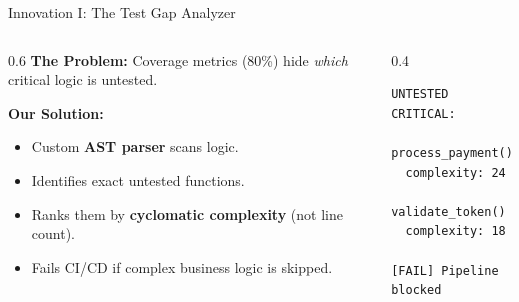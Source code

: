 \documentclass[aspectratio=169, 10pt]{beamer}
\begin{document}
\begin{frame}[fragile]{Innovation I: The Test Gap Analyzer}
  \begin{columns}[T]
    \begin{column}{0.6\textwidth}
      \textbf{The Problem:}
      Coverage metrics (80\%) hide \textit{which} critical logic is untested.

      \vspace{1em}
      \textbf{Our Solution:}
      \begin{itemize}\setlength\itemsep{0.5em}
        \item Custom \textbf{AST parser} scans logic.
        \item Identifies exact untested functions.
        \item Ranks them by \textbf{cyclomatic complexity} (not line count).
        \item Fails CI/CD if complex business logic is skipped.
      \end{itemize}
    \end{column}
    \begin{column}{0.4\textwidth}
      \begin{tcolorbox}[colback=acrNavy,title={\textbf{CI/CD Output}},coltext=white]
\begin{lstlisting}[style=shellstyle]
UNTESTED CRITICAL:
 process_payment()
  complexity: 24
 validate_token()
  complexity: 18

[FAIL] Pipeline blocked
\end{lstlisting}
      \end{tcolorbox}
    \end{column}
  \end{columns}
\end{frame}
\end{document}
